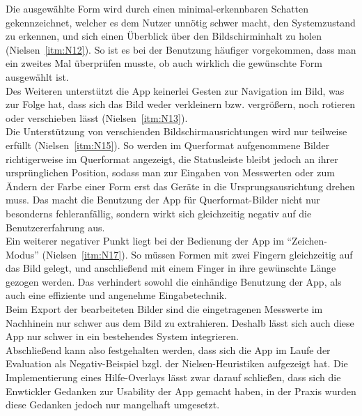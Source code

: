 Die ausgewählte Form wird durch einen minimal-erkennbaren Schatten gekennzeichnet, welcher es dem Nutzer unnötig schwer macht, den Systemzustand zu erkennen, und sich einen Überblick über den Bildschirminhalt zu holen (Nielsen~\autoref{itm:N12}).
So ist es bei der Benutzung häufiger vorgekommen, dass man ein zweites Mal überprüfen musste, ob auch wirklich die gewünschte Form ausgewählt ist. \\

Des Weiteren unterstützt die App keinerlei Gesten zur Navigation im Bild, was zur Folge hat, dass sich das Bild weder verkleinern bzw. vergrößern, noch rotieren oder verschieben lässt (Nielsen~\autoref{itm:N13}).  \\

Die Unterstützung von verschienden Bildschirmausrichtungen wird nur teilweise erfüllt (Nielsen~\autoref{itm:N15}).
So werden im Querformat aufgenommene Bilder richtigerweise im Querformat angezeigt, die Statusleiste bleibt jedoch an ihrer ursprünglichen Position, sodass man zur Eingaben von Messwerten oder zum Ändern der Farbe einer Form erst das Geräte in die Ursprungsausrichtung drehen muss.
Das macht die Benutzung der App für Querformat-Bilder nicht nur besonderns fehleranfällig, sondern wirkt sich gleichzeitig negativ auf die Benutzererfahrung aus. \\

Ein weiterer negativer Punkt liegt bei der Bedienung der App im ``Zeichen-Modus'' (Nielsen~\autoref{itm:N17}).
So müssen Formen mit zwei Fingern gleichzeitig auf das Bild gelegt, und anschließend mit einem Finger in ihre gewünschte Länge gezogen werden.
Das verhindert sowohl die einhändige Benutzung der App, als auch eine effiziente und angenehme Eingabetechnik. \\

Beim Export der bearbeiteten Bilder sind die eingetragenen Messwerte im Nachhinein nur schwer aus dem Bild zu extrahieren.
Deshalb lässt sich auch diese App nur schwer in ein bestehendes System integrieren. \\

Abschließend kann also festgehalten werden, dass sich die App im Laufe der Evaluation als Negativ-Beispiel bzgl. der Nielsen-Heuristiken aufgezeigt hat. 
Die Implementierung eines Hilfe-Overlays lässt zwar darauf schließen, dass sich die Enwtickler Gedanken zur Usability der App gemacht haben, in der Praxis wurden diese Gedanken jedoch nur mangelhaft umgesetzt.
